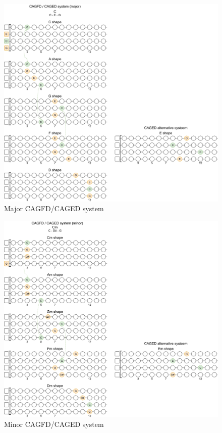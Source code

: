 \begin{figure}[h]
	\centering
	\includegraphics[width=\textwidth]{../../Images/UkuleleCagfdMajor.png}
	\caption{Major CAGFD/CAGED system}
	\label{fig:ukulele_major_cagfd_caged}
\end{figure}

\newpage

\begin{figure}[h]
	\centering
	\includegraphics[width=\textwidth]{../../Images/UkuleleCagfdMinor.png}
	\caption{Minor CAGFD/CAGED system}
	\label{fig:ukulele_minor_cagfd_caged}
\end{figure}

